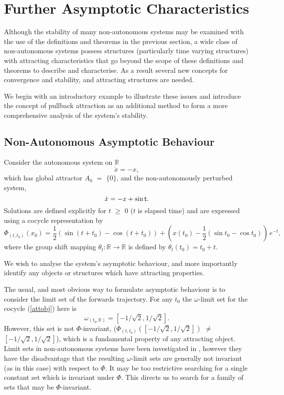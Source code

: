 \section{Further Asymptotic Characteristics}

Although the stability of many non-autonomous systems may be
examined with the use of the definitions and theorems in the
previous section, a wide class of non-autonomous systems possess
structures (particularly time varying structures) with attracting
characteristics that go beyond the scope of these definitions and theorems to
describe and characterise. As a result several new concepts for convergence and
stability, and attracting structures are needed.

We begin with an introductory example to illustrate these issues and introduce
the concept of pullback attraction as an additional method to form a more
comprehensive analysis of the system's stability.

\subsection{Non-Autonomous Asymptotic Behaviour}

\begin{eg}\label{introeg}
{\rm
Consider the autonomous system on $\mathbb{R}$
\[ \dot{x} = -x, \]
which has global attractor $A_0$ $=$ $\{0\}$, and the non-autonomously
perturbed system,
\[ \dot{x} = - x + \sin  \mathsf{\mathsf{t}}. \]
Solutions are defined explicitly for $t$ $\geq$ $0$ ($t$ is elapsed time) and are
expressed using a cocycle representation by \vspace{2mm}
\begin{equation}\label{attobj}
\Phi_{(t,t_0)}(x_0) =
       \frac{1}{2} \left(\sin (t+t_0) - \cos (t+t_0)\right) +
       \left( x(t_0) - \frac{1}{2}
       \left(\sin t_0 - \cos t_0 \right)\right) \, e^{-t},
\end{equation}
where the group shift mapping $\theta_t:\mathbb{R} \rightarrow \mathbb{R}$
is defined by $\theta_t (t_0) = t_0 +t$. }
\end{eg}

We wish to analyse the system's asymptotic behaviour, and more importantly
identify any objects or structures which have attracting properties.

The usual, and most obvious way to formulate asymptotic behaviour is to
consider the limit set of the forwards trajectory. For any $t_0$ the
$\omega$-limit set for the cocycle (\ref{attobj}) here is
\[ \omega_(t_0,\mathbb{R}) = [-1/\sqrt{2},1/\sqrt{2}]. \]
However, this set is not $\Phi$-invariant,
($\Phi_{(t,t_0)}([-1/\sqrt{2},1/\sqrt{2}])$ $\neq$ $[-1/\sqrt{2}, 1/\sqrt{2}]$), 
which is a fundamental property of any attracting object. Limit sets in non-autonomous
systems have been investigated in \cite{FS95,Vi92}, however they
have the disadvantage that the resulting $\omega$-limit sets are
generally not invariant (as in this case) with respect to $\Phi$.
It may be too restrictive searching for a single constant set
which is invariant under $\Phi$. This directs us to search for a
family of sets that may be $\Phi$-invariant.

